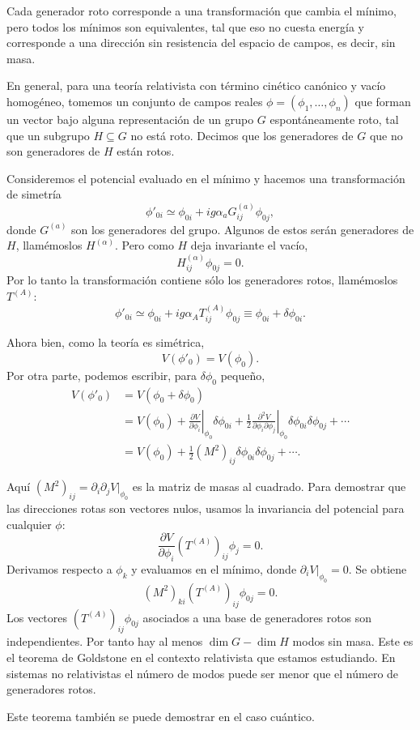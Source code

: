 \documentclass[11pt,a4paper]{article}
\newcommand{\concept}[1]{\textcolor{concept-green}{#1}}
\begin{document}
Cada generador roto corresponde a una transformación que cambia el mínimo,
pero todos los mínimos son equivalentes, tal que eso no cuesta energía y
corresponde a una dirección sin resistencia del espacio de campos, es decir,
sin masa.

En general, para una teoría relativista con término cinético canónico
y vacío homogéneo, tomemos un conjunto de campos reales
$\phi=(\phi_1,\ldots,\phi_n)$ que forman un vector bajo alguna representación de
un grupo $G$ espontáneamente roto, tal que un subgrupo $H\subseteq G$ no está
roto. Decimos que los generadores de $G$ que no son generadores de $H$ están
rotos.

Consideremos el potencial evaluado en el mínimo y hacemos una transformación
de simetría
\[
  \phi'_{0i}\simeq
  \phi_{0i}+ig\alpha_aG_{ij}^{(a)}\phi_{0j},
\]
donde $G^{(a)}$ son los generadores del grupo. Algunos de estos serán
generadores de $H$, llamémoslos $H^{(\alpha)}$. Pero como $H$ deja invariante el
vacío,
\[
  H_{ij}^{(\alpha)}\phi_{0j}=0.
\]
Por lo tanto la transformación contiene sólo los generadores rotos, llamémoslos
$T^{(A)}$:
\[
  \phi'_{0i}\simeq
  \phi_{0i}+ig\alpha_AT_{ij}^{(A)}\phi_{0j}
  \equiv\phi_{0i}+\delta\phi_{0i}.
\]

Ahora bien, como la teoría es simétrica,
\[
  V(\phi'_0)=V(\phi_0).
\]
Por otra parte, podemos escribir, para $\delta\phi_0$ pequeño,
\begin{align*}
  V(\phi'_0)
  &=V(\phi_0+\delta\phi_0)\\
  &=V(\phi_0)
    +\left.\frac{\partial V}{\partial\phi_i}\right|_{\phi_0}\delta\phi_{0i}
    +\frac12\left.\frac{\partial^2V}{\partial\phi_i\partial\phi_j}
      \right|_{\phi_0}
      \delta\phi_{0i}\delta\phi_{0j}+\cdots\\
  &=V(\phi_0)+\frac12(M^2)_{ij}\delta\phi_{0i}\delta\phi_{0j}+\cdots.
\end{align*}

Aquí $(M^2)_{ij}=\partial_i\partial_jV|_{\phi_0}$ es la
matriz de masas al cuadrado. Para demostrar que las direcciones rotas
son vectores nulos, usamos la invariancia del potencial para cualquier
$\phi$:
\[
  \frac{\partial V}{\partial\phi_i}
  (T^{(A)})_{ij}\phi_j=0.
\]
Derivamos respecto a $\phi_k$ y evaluamos en el mínimo,
donde $\partial_iV|_{\phi_0}=0$. Se obtiene
\[
  (M^2)_{ki}(T^{(A)})_{ij}\phi_{0j}=0.
\]
Los vectores $(T^{(A)})_{ij}\phi_{0j}$ asociados a una base de
generadores rotos son independientes. Por tanto hay al menos
$\dim G-\dim H$ modos sin masa. Este es el \concept{teorema de Goldstone}
en el contexto relativista que estamos estudiando.
En sistemas no relativistas el número de modos puede ser menor que
el número de generadores rotos.

Este teorema también se puede demostrar en el caso cuántico.
\end{document}
